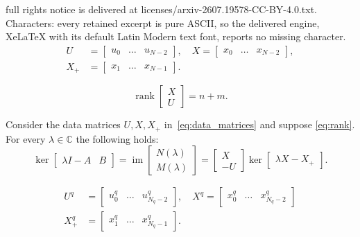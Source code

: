 \documentclass[10pt,a4paper]{amsart}
\begin{document}
full rights notice is delivered at licenses/arxiv-2607.19578-CC-BY-4.0.txt. Characters: every retained excerpt is pure ASCII, so the delivered engine, XeLaTeX with its default Latin Modern text font, reports no missing character.
\begin{equation}
    \label{eq:data_matrices}
    \begin{aligned}
    U &= \begin{bmatrix}
        u_0 & \dots & u_{N-2}
    \end{bmatrix},\quad X = \begin{bmatrix}
        x_0 & \dots & x_{N-2}
    \end{bmatrix},\\
    X_+ &= \begin{bmatrix}
        x_1 & \dots & x_{N-1}
    \end{bmatrix}.
    \end{aligned}
\end{equation}

\begin{equation}
    \label{eq:rank}
    \operatorname{rank}\begin{bmatrix}
        X\\ U
    \end{bmatrix} = n+m.
\end{equation}

\begin{lemma}
    \label{lem:data_kernel}
    Consider the data matrices $U,X,X_+$ in~\eqref{eq:data_matrices} and suppose \eqref{eq:rank}. For every $\lambda\in\mathbb C$ the following holds:
    \begin{equation}
    \label{eq:data_kernel}
        \operatorname{ker}\begin{bmatrix}
            \lambda I - A & B
        \end{bmatrix} = \operatorname{im}\begin{bmatrix} N(\lambda)\\ M(\lambda) \end{bmatrix}=  \begin{bmatrix} X\\ -U\end{bmatrix}\operatorname{ker}\begin{bmatrix}
        \lambda X-X_+\end{bmatrix}.
        \end{equation}
\end{lemma}

\begin{equation}
\label{eq:data_matq}
\begin{aligned}
    U^q &= \begin{bmatrix}
        u_0^q&\dots &u_{N_q-2}^q
    \end{bmatrix},\quad X^q = \begin{bmatrix}
        x_0^q & \dots & x_{N_q-2}^q
    \end{bmatrix}\\
    X_+^q &= \begin{bmatrix}
        x_1^q&\dots & x_{N_q-1}^q
    \end{bmatrix}.
\end{aligned}
\end{equation}
\end{document}
